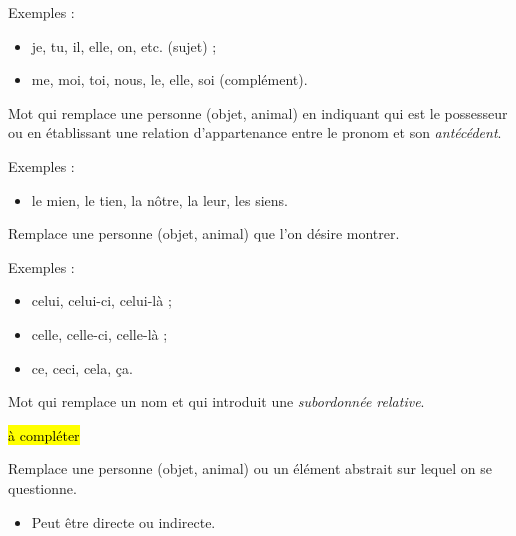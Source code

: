 \documentclass[10pt, french]{article}
\begin{document}
\begin{multicols*}{2}
\begin{definitionNOHFILLsub}
Exemples :
\begin{itemize}
	\item	je, tu, il, elle, on, etc. (sujet) ;
	\item	me, moi, toi, nous, le, elle, soi (complément).
\end{itemize}
\end{definitionNOHFILLsub}

\begin{definitionNOHFILLsub}
Mot qui remplace une personne (objet, animal) en indiquant qui est le possesseur ou en établissant une relation d'appartenance entre le pronom et son \textit{antécédent}.

\tcbline

Exemples :
\begin{itemize}
	\item	le mien, le tien, la nôtre, la leur, les siens.
\end{itemize}
\end{definitionNOHFILLsub}

\begin{definitionNOHFILLsub}
Remplace une personne (objet, animal) que l'on désire montrer.

\tcbline

Exemples :
\begin{itemize}
	\item	celui, celui-ci, celui-là ;
	\item	celle, celle-ci, celle-là ;
	\item	ce, ceci, cela, ça.
\end{itemize}
\end{definitionNOHFILLsub}

\begin{definitionNOHFILLsub}
Mot qui remplace un nom et qui introduit une \textit{subordonnée relative}.

\tcbline


\hl{à compléter}
\end{definitionNOHFILLsub}

\begin{definitionNOHFILLsub}
Remplace une personne (objet, animal) ou un élément abstrait sur lequel on se questionne.
\begin{itemize}
	\item	Peut être directe ou indirecte.
\end{itemize}

\tcbline


\end{definitionNOHFILLsub}
\end{multicols*}
\end{document}
